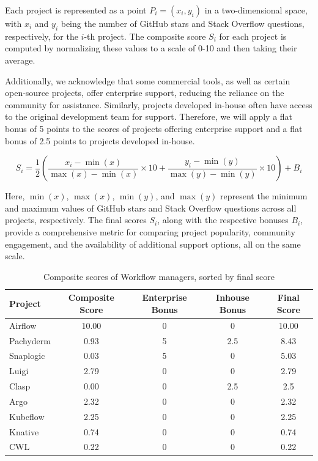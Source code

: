 Each project is represented as a point \(P_i = (x_i, y_i)\) in a two-dimensional space, with \(x_i\) and \(y_i\) being the number of GitHub stars and Stack Overflow questions, respectively, for the \(i\)-th project. The composite score \(S_i\) for each project is computed by normalizing these values to a scale of 0-10 and then taking their average.

Additionally, we acknowledge that some commercial tools, as well as certain open-source projects, offer enterprise support, reducing the reliance on the community for assistance. Similarly, projects developed in-house often have access to the original development team for support. Therefore, we will apply a flat bonus of 5 points to the scores of projects offering enterprise support and a flat bonus of 2.5 points to projects developed in-house.

\[S_i = \frac{1}{2} \left( \frac{x_i - \min(x)}{\max(x) - \min(x)} \times 10 + \frac{y_i - \min(y)}{\max(y) - \min(y)} \times 10 \right) + B_i \]

Here, \(\min(x)\), \(\max(x)\), \(\min(y)\), and \(\max(y)\) represent the minimum and maximum values of GitHub stars and Stack Overflow questions across all projects, respectively. The final scores \(S_i\), along with the respective bonuses \(B_i\), provide a comprehensive metric for comparing project popularity, community engagement, and the availability of additional support options, all on the same scale.

\begin{table}[h!]
    \centering
    \begin{tabular}{|l|c|c|c|c|} 
    \hline
        \textbf{Project} & \textbf{Composite Score} & \textbf{Enterprise Bonus} & \textbf{Inhouse Bonus}  & \textbf{Final Score}\\
        \hline
        Airflow & 10.00 & 0 & 0 & 10.00 \\
        Pachyderm & 0.93 & 5 & 2.5 & 8.43 \\
        Snaplogic & 0.03 & 5 & 0 & 5.03 \\
        Luigi & 2.79 & 0 & 0 & 2.79 \\
        Clasp & 0.00 & 0 & 2.5 & 2.5 \\
        Argo & 2.32 & 0 & 0 & 2.32 \\
        Kubeflow & 2.25 & 0 & 0 & 2.25 \\
        Knative & 0.74 & 0 & 0 & 0.74 \\
        CWL & 0.22 & 0 & 0 & 0.22 \\
    \hline
    \end{tabular}
    \caption{Composite scores of Workflow managers, sorted by final score}
    \label{tab:results}
\end{table}


